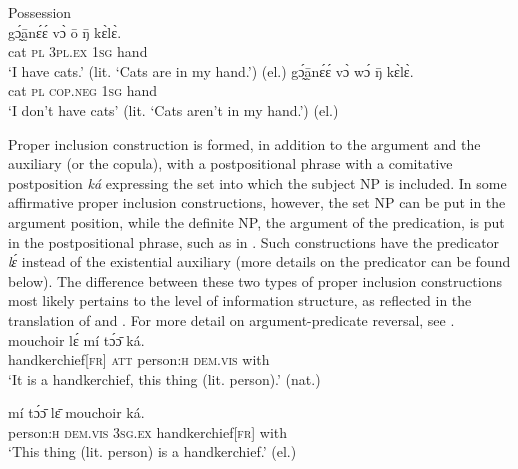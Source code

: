 \documentclass[output=paper,colorlinks,citecolor=brown]{langscibook}
\begin{document}
\ea\label{ex:mano:3435} Possession\\
\ea\label{ex:mano:34} 
    \gll gɔ̰́ā̰nɛ́ɛ́ vɔ̀ ō ŋ̄ kɛ̀lɛ̀.   \\
         cat \textsc{pl} 3\textsc{pl.ex} 1\textsc{sg} hand   \\
    \glt ‘I have cats.’ (lit. ‘Cats are in my hand.’) (el.)
\ex\label{ex:mano:35}
    \gll gɔ̰́ā̰nɛ́ɛ́ vɔ̀ wɔ́ ŋ̄ kɛ̀lɛ̀.   \\
         cat \textsc{pl} \textsc{cop.neg} \textsc{1sg} hand   \\
    \glt ‘I don’t have cats’ (lit. ‘Cats aren’t in my hand.’) (el.)
\z\z 

Proper inclusion construction is formed, in addition to the argument and the auxiliary (or the copula), with a postpositional phrase with a comitative postposition \textit{ká}
expressing the set into which the subject NP is included. In some affirmative proper inclusion constructions, however, the set NP can be put in the argument position, while the definite NP, the argument of the predication, is put in the postpositional phrase, such as in . Such constructions have the predicator \textit{lɛ́ } instead of the existential auxiliary (more details on the predicator can be found below). The difference between these two types of proper inclusion constructions most likely pertains to the level of information structure, as reflected in the translation of  and . For more detail on argument-predicate reversal, see \citet{KhachaturyanForthcoming}.
\ea\label{ex:mano:36}
    \gll mouchoir lɛ́ mí tɔ́ɔ̄ ká.\\
         handkerchief\textsc{[fr]} \textsc{att} person:\textsc{h} \textsc{dem.vis} with\\
    \glt ‘It is a handkerchief, this thing (lit. person).’ (nat.)
\z

\ea\label{ex:mano:37}
    \gll mí tɔ́ɔ̄ lɛ̄ mouchoir ká.\\
         person:\textsc{h} \textsc{dem.vis} \textsc{3sg.ex} handkerchief\textsc{[fr]} with\\
    \glt ‘This thing (lit. person) is a handkerchief.’ (el.)
\z
\end{document}
